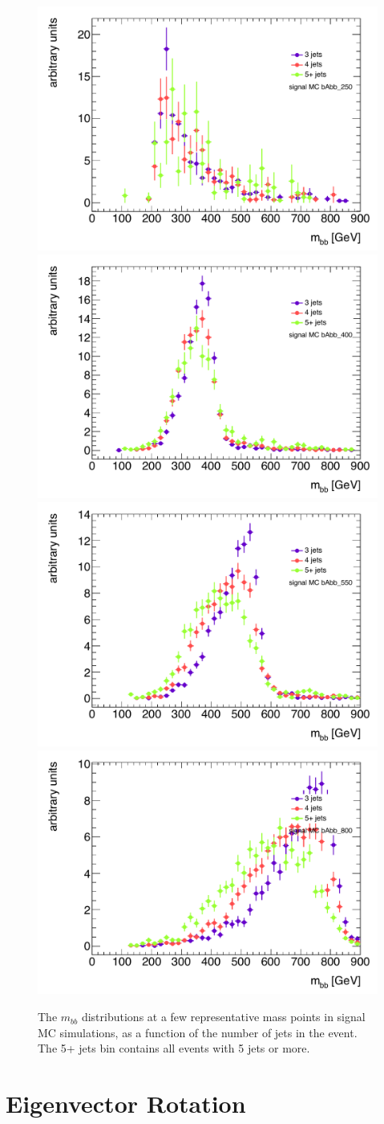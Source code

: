 \begin{figure}[hbt]
  \includegraphics[width=0.45\linewidth]{SignalKin/mbb_njets_bAbb_250.pdf}
  \includegraphics[width=0.45\linewidth]{SignalKin/mbb_njets_bAbb_400.pdf}
\newline
  \includegraphics[width=0.45\linewidth]{SignalKin/mbb_njets_bAbb_550.pdf}
  \includegraphics[width=0.45\linewidth]{SignalKin/mbb_njets_bAbb_800.pdf}
  \caption{The $m_{bb}$ distributions at a few representative mass points in signal MC simulations, 
  as a function of the number of jets in the event.  
    The 5+ jets bin contains all events with 5 jets or more.\label{fig:mbb_njets_signal}}
\end{figure}

\section{Eigenvector Rotation}
\label{sec:rotation}

